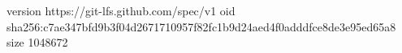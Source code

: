 version https://git-lfs.github.com/spec/v1
oid sha256:c7ae347bfd9b3f04d2671710957f82fc1b9d24aed4f0adddfce8de3e95ed65a8
size 1048672
